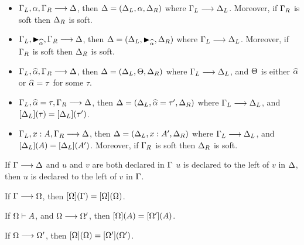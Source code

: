 \begin{lemma}\leavevmode
  \label{lemma:dunfield:ExtensionOrder}
  \begin{itemize}
  \item $\Gamma_L, \alpha, \Gamma_R \longrightarrow \Delta$,
    then $\Delta = (\Delta_L, \alpha, \Delta_R)$
    where $\Gamma_L \longrightarrow \Delta_L$.
    Moreover, if $\Gamma_R$ is soft then $\Delta_R$ is soft.
  \item $\Gamma_L, \blacktriangleright_{\widehat{\alpha}}, \Gamma_R \longrightarrow \Delta$,
    then $\Delta = (\Delta_L, \blacktriangleright_{\widehat{\alpha}}, \Delta_R)$
    where $\Gamma_L \longrightarrow \Delta_L$.
    Moreover, if $\Gamma_R$ is soft then $\Delta_R$ is soft.
  \item $\Gamma_L, \widehat{\alpha}, \Gamma_R \longrightarrow \Delta$,
    then $\Delta = (\Delta_L, \Theta, \Delta_R)$
    where $\Gamma_L \longrightarrow \Delta_L$,
    and $\Theta$ is either $\widehat{\alpha}$ or $\widehat{\alpha} = \tau$ for some $\tau$.
  \item $\Gamma_L, \widehat{\alpha} = \tau, \Gamma_R \longrightarrow \Delta$,
    then $\Delta = (\Delta_L, \widehat{\alpha} = \tau', \Delta_R)$
    where $\Gamma_L \longrightarrow \Delta_L$,
    and $[\Delta_L](\tau) = [\Delta_L](\tau')$.
  \item $\Gamma_L, x : A, \Gamma_R \longrightarrow \Delta$,
    then $\Delta = (\Delta_L, x : A', \Delta_R)$
    where $\Gamma_L \longrightarrow \Delta_L$,
    and $[\Delta_L](A) = [\Delta_L](A')$.
    Moreover, if $\Gamma_R$ is soft then $\Delta_R$ is soft.
  \end{itemize}
\end{lemma}

\begin{lemma}
  \label{lemma:dunfield:ReverseDeclarationOrderPreservation}
  If $\Gamma \longrightarrow \Delta$ and $u$ and $v$ are both declared in $\Gamma$ $u$ is
  declared to the left of $v$ in $\Delta$,
  then $u$ is declared to the left of $v$ in $\Gamma$.
\end{lemma}

\begin{lemma}
  \label{lemma:dunfield:StabilityOfCompleteContexts}
  If $\Gamma \longrightarrow \Omega $,
  then $[\Omega](\Gamma) = [\Omega](\Omega) $.
\end{lemma}

\begin{lemma}
  \label{lemma:dunfield:FinishingTypes}
  If $\Omega \vdash A $,
  and $\Omega \longrightarrow \Omega' $,
  then $[\Omega](A) = [\Omega'](A) $.
\end{lemma}

\begin{lemma}
  \label{lemma:dunfield:FinishingCompletions}
  If $\Omega \longrightarrow \Omega' $,
  then $[\Omega](\Omega) = [\Omega'](\Omega') $.
\end{lemma}

